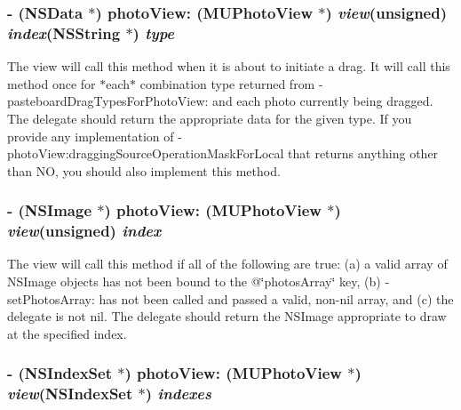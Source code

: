 \subsubsection{\setlength{\rightskip}{0pt plus 5cm}- (NSData $\ast$) photo\-View: ({\bf MUPhoto\-View} $\ast$) {\em view}(unsigned) {\em index}(NSString $\ast$) {\em type}}\label{category_n_s_object(_m_u_photo_view_delegate)_6087d843615018dd2c384958fc5efd09}


The view will call this method when it is about to initiate a drag. It will call this method once for $\ast$each$\ast$ combination type returned from -pasteboard\-Drag\-Types\-For\-Photo\-View: and each photo currently being dragged. The delegate should return the appropriate data for the given type. If you provide any implementation of -photo\-View:dragging\-Source\-Operation\-Mask\-For\-Local that returns anything other than NO, you should also implement this method. 
\subsubsection{\setlength{\rightskip}{0pt plus 5cm}- (NSImage $\ast$) photo\-View: ({\bf MUPhoto\-View} $\ast$) {\em view}(unsigned) {\em index}}\label{category_n_s_object(_m_u_photo_view_delegate)_f29adaf349861b6ab7c2b427114ab73d}


The view will call this method if all of the following are true: (a) a valid array of NSImage objects has not been bound to the @\char`\"{}photos\-Array\char`\"{} key, (b) -set\-Photos\-Array: has not been called and passed a valid, non-nil array, and (c) the delegate is not nil. The delegate should return the NSImage appropriate to draw at the specified index. 
\subsubsection{\setlength{\rightskip}{0pt plus 5cm}- (NSIndex\-Set $\ast$) photo\-View: ({\bf MUPhoto\-View} $\ast$) {\em view}(NSIndex\-Set $\ast$) {\em indexes}}\label{category_n_s_object(_m_u_photo_view_delegate)_f33d75adf985e0ed868468aca41cc0ee}


